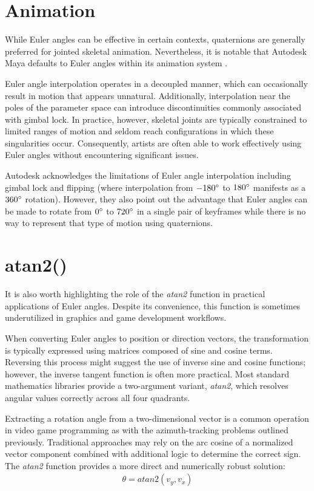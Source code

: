 \documentclass[sigconf]{acmart}
\begin{document}
\section{Animation}
While Euler angles can be effective in certain contexts, quaternions are generally preferred for jointed skeletal animation. Nevertheless, it is notable that Autodesk Maya defaults to Euler angles within its animation system \cite{Autodesk1}.

Euler angle interpolation operates in a decoupled manner, which can occasionally result in motion that appears unnatural. Additionally, interpolation near the poles of the parameter space can introduce discontinuities commonly associated with gimbal lock. In practice, however, skeletal joints are typically constrained to limited ranges of motion and seldom reach configurations in which these singularities occur. Consequently, artists are often able to work effectively using Euler angles without encountering significant issues.

Autodesk \cite{Autodesk1} acknowledges the limitations of Euler angle interpolation including gimbal lock and flipping (where interpolation from \(-180\degree\) to \(180\degree\) manifests as a \(360\degree\) rotation). However, they also point out the advantage that Euler angles can be made to rotate from \(0\degree\) to \(720\degree\) in a single pair of keyframes while there is no way to represent that type of motion using quaternions.

\section{atan2()}
It is also worth highlighting the role of the \textit{atan2} function in practical applications of Euler angles. Despite its convenience, this function is sometimes underutilized in graphics and game development workflows.

When converting Euler angles to position or direction vectors, the transformation is typically expressed using matrices composed of sine and cosine terms. Reversing this process might suggest the use of inverse sine and cosine functions; however, the inverse tangent function is often more practical. Most standard mathematics libraries provide a two-argument variant, \textit{atan2}, which resolves angular values correctly across all four quadrants.

Extracting a rotation angle from a two-dimensional vector is a common operation in video game programming as with the azimuth-tracking problems outlined previously. Traditional approaches may rely on the arc cosine of a normalized vector component combined with additional logic to determine the correct sign. The \textit{atan2} function provides a more direct and numerically robust solution:
\begin{align}
\theta = atan2(v_y, v_x)
\end{align}
\end{document}
